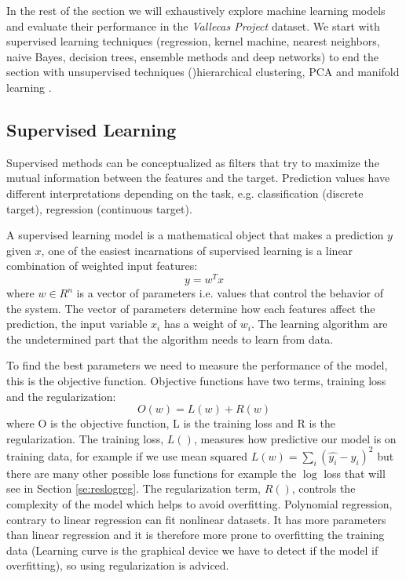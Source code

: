 \documentclass[11pt]{article}
\theoremstyle{definition}
\theoremstyle{remark}
\begin{document}
In the rest of the section we will exhaustively explore machine learning models and evaluate their performance in the \emph{Vallecas Project} dataset. We start with supervised learning techniques (regression, kernel machine, nearest neighbors, naive Bayes, decision trees, ensemble methods and deep networks) to end the section with unsupervised techniques ()hierarchical clustering, PCA and manifold learning .

\subsection{Supervised Learning}
\label{sse:sup}
Supervised methods can be conceptualized as filters that try to maximize the mutual information between the features and the target. Prediction values have different interpretations depending on the task, e.g. classification (discrete target), regression (continuous target). 

A supervised learning model is a mathematical object that makes a prediction $y$ given $x$, one of the easiest incarnations of supervised learning is a linear combination of weighted input features:
\begin{equation}
y = w^Tx
\label{eq:reg1}
\end{equation}
where $w \in R^n$ is a vector of parameters i.e. values that control the behavior of the system. The vector of parameters determine how each features affect the prediction, the input variable $x_i$ has a weight of $w_i$.
The learning algorithm are the undetermined part that the algorithm needs to learn from data. 

To find the best parameters we need to measure the performance of the model, this is the objective function. Objective functions have two terms, training loss and the regularization:
\begin{equation}
O(w) = L(w) + R(w)
\end{equation}
where O is the objective function, L is the training loss and R is the regularization. The training loss, $L()$, measures how predictive our model is on training data, for example if we use mean squared $L(w) = \sum_i (\hat{y_i} - y_i)^2$ but there are many other possible loss functions for example the $\log$ loss that will see in Section \ref{se:reslogreg}. The regularization term, $R()$, controls the complexity of the model which helps to avoid overfitting. Polynomial regression, contrary to linear regression can fit nonlinear datasets. It has more parameters than linear regression and it is therefore more prone to overfitting the training data (Learning curve is the graphical device we have to detect if the model if overfitting), so using regularization is adviced.
\end{document}
